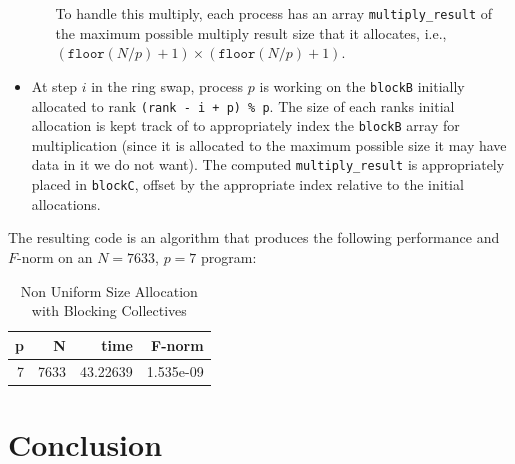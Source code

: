 \documentclass{article}
\begin{document}
\begin{itemize}
\begin{itemize}
\begin{enumerate}
        \end{enumerate}
        To handle this multiply, each process has an array \texttt{multiply\_result} of the maximum possible multiply result size that it allocates,
        i.e., $(\texttt{floor}(N/p) + 1) \times (\texttt{floor}(N/p) + 1)$.
    \end{itemize}
    \item At step $i$ in the ring swap, process $p$ is working on the \texttt{blockB} initially allocated to rank \texttt{(rank - i + p) \% p}.
    The size of each ranks initial allocation is kept track of to appropriately index the \texttt{blockB} array for multiplication 
    (since it is allocated to the maximum possible size it may have data in it we do not want). The computed \texttt{multiply\_result} is appropriately placed in \texttt{blockC}, offset 
    by the appropriate index relative to the initial allocations. 
\end{itemize}
The resulting code is an algorithm that produces 
    the following performance and $F$-norm on an $N = 7633$, $p = 7$ program:
    \begin{table}[H]
        \centering
        \caption{Non Uniform Size Allocation with Blocking Collectives}
        \fontsize{12}{14}\selectfont
        \begin{tabular}[t]{rrrr}
        \toprule
        p & N & time & F-norm\\
        \midrule
        7 & 7633 & 43.22639 & 1.535e-09\\
        \bottomrule
        \end{tabular}
\end{table}

\section{Conclusion}
\end{document}
